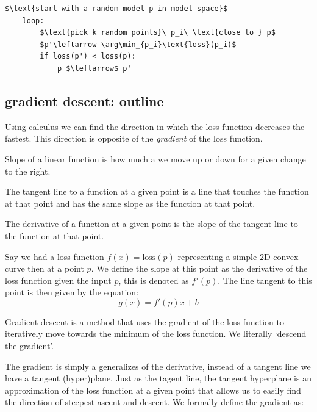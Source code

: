 \documentclass[12pt]{article}
\begin{document}
\begin{lstlisting}[caption=branching search]
    $\text{start with a random model p in model space}$
    loop:
        $\text{pick k random points}\ p_i\ \text{close to } p$
        $p'\leftarrow \arg\min_{p_i}\text{loss}(p_i)$
        if loss(p') < loss(p):
            p $\leftarrow$ p'
\end{lstlisting}

\subsection{gradient descent: outline}

Using calculus we can find the direction in which the loss function decreases the fastest. This direction is opposite of the \textit{gradient} of the loss function.

\begin{definition}[slope]
    Slope of a linear function is how much a we move up or down for a given change to the right.
\end{definition}

\begin{definition}
    The tangent line to a function at a given point is a line that touches the function at that point and has the same slope as the function at that point.    
\end{definition}

\begin{definition}[derivative]
    The derivative of a function at a given point is the slope of the tangent line to the function at that point.
\end{definition}

Say we had a loss function $f(x) = \text{loss}(p)$ representing a simple 2D convex curve then at a point $p$. We define the slope at this point as the derivative of the loss function given the input $p$, this is denoted as $f'(p)$. The line tangent to this point is then given by the equation:
\begin{equation}
    g(x) = f'(p)x + b
\end{equation}

\begin{definition}
    Gradient descent is a method that uses the gradient of the loss function to iteratively move towards the minimum of the loss function. We literally `descend the gradient'.
\end{definition}

The gradient is simply a generalizes of the derivative, instead of a tangent line we have a tangent (hyper)plane. Just as the tagent line, the tangent hyperplane is an approximation of the loss function at a given point that allows us to easily find the direction of steepest ascent and descent. We formally define the gradient as:
\end{document}
